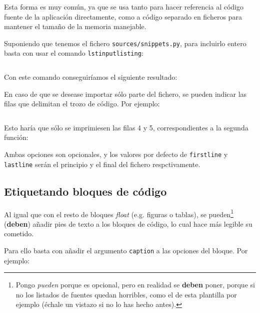 Esta forma es muy común, ya que se usa tanto para hacer referencia al código fuente de la aplicación directamente, como a código separado en ficheros para mantener el tamaño de la memoria manejable.

Suponiendo que tenemos el fichero \texttt{sources/snippets.py}, para incluirlo entero basta con usar el comando \texttt{lstinputlisting}:

\begin{lstlisting}[language=TeX]

\end{lstlisting}

Con este comando conseguiríamos el siguiente resultado:



En caso de que se desease importar sólo parte del fichero, se pueden indicar las filas que delimitan el trozo de código. Por ejemplo:

\begin{lstlisting}[language=TeX]

\end{lstlisting}

Esto haría que sólo se imprimiesen las filas 4 y 5, correspondientes a la segunda función:



Ambas opciones son opcionales, y los valores por defecto de \texttt{firstline} y \texttt{lastline} serán el principio y el final del fichero respctivamente.

\subsection{Etiquetando bloques de código}

Al igual que con el resto de bloques \textit{float} (e.g. figuras o tablas), se pueden\footnote{Pongo \textit{pueden} porque es opcional, pero en realidad se \textbf{deben} poner, porque si no los listados de fuentes quedan horribles, como el de esta plantilla por ejemplo (échale un vistazo si no lo has hecho antes).} (\textbf{deben}) añadir pies de texto a los bloques de código, lo cual hace más legible su cometido.

Para ello basta con añadir el argumento \texttt{caption} a las opciones del bloque. Por ejemplo:



